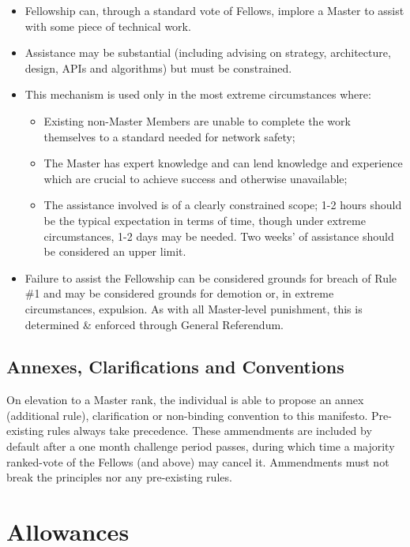 \documentclass[9pt,oneside]{amsart}
\begin{document}
\begin{itemize}
  \item Fellowship can, through a standard vote of Fellows, implore a Master to assist with some piece of technical work.
  \item Assistance may be substantial (including advising on strategy, architecture, design, APIs and algorithms) but must be constrained.
  \item This mechanism is used only in the most extreme circumstances where:
    \begin{itemize}
      \item Existing non-Master Members are unable to complete the work themselves to a standard needed for network safety;
      \item The Master has expert knowledge and can lend knowledge and experience which are crucial to achieve success and otherwise unavailable;
      \item The assistance involved is of a clearly constrained scope; 1-2 hours should be the typical expectation in terms of time, though under extreme circumstances, 1-2 days may be needed. Two weeks' of assistance should be considered an upper limit.
    \end{itemize}
  \item Failure to assist the Fellowship can be considered grounds for breach of Rule \#1 and may be considered grounds for demotion or, in extreme circumstances, expulsion. As with all Master-level punishment, this is determined \& enforced through General Referendum.
\end{itemize}

\subsection{Annexes, Clarifications and Conventions}\label{annexes-clarifications-and-conventions}

On elevation to a Master rank, the individual is able to propose an annex (additional rule), clarification or non-binding convention to this manifesto. Pre-existing rules always take precedence. These ammendments are included by default after a one month challenge period passes, during which time a majority ranked-vote of the Fellows (and above) may cancel it. Ammendments must not break the principles nor any pre-existing rules.

\section{Allowances}\label{allowances}
\end{document}
